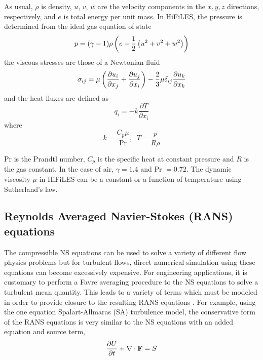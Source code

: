 As usual, $\rho$ is density, $u$, $v$, $w$ are the velocity components in the $x, y, z$ directions, respectively, and $e$ is total energy per unit mass. In HiFiLES, the pressure is determined from the ideal gas equation of state
\begin{equation}
p = (\gamma - 1)\rho\left(e - \frac{1}{2}\left(u^2 + v^2 + w^2\right)\right)
\end{equation}
the viscous stresses are those of a Newtonian fluid
\begin{equation}
\sigma_{ij} = \mu\left( \frac{\partial u_i}{\partial x_j}
+ \frac{\partial u_j}{\partial x_i} \right)
- \frac{2}{3}\mu \delta_{ij}\frac{\partial u_k}{\partial x_k}
\end{equation}
and the heat fluxes are defined as
\begin{equation}
q_i = -k \frac{\partial T}{\partial x_i}
\end{equation}
where
\begin{equation}
k = \frac{C_p \mu}{\text{Pr}} , \;\; T = \frac{p}{R \rho}
\end{equation}

Pr is the Prandtl number, $C_p$ is the specific heat at constant pressure and $R$ is the gas constant. In the case of air, $\gamma = 1.4$ and Pr $= 0.72$. The dynamic viscosity $\mu$ in HiFiLES can be a constant or a function of temperature using Sutherland's law.


\subsection{Reynolds Averaged Navier-Stokes (RANS) equations}
The compressible NS equations can be used to solve a variety of different flow physics problems but for turbulent flows, direct numerical simulation using these equations can become excessively expensive. For engineering applications, it is customary to perform a Favre averaging procedure to the NS equations to solve a turbulent mean quantity. This leads to a variety of terms which must be modeled in order to provide closure to the resulting RANS equations \cite{wilcox1998turbulence,oliver2008high}. For example, using the one equation Spalart-Allmaras (SA) turbulence model, the conservative form of the RANS equations is very similar to the NS equations with an added equation and source term,
\begin{align}
	\frac{\partial U}{\partial t} +  \nabla \cdot {\bf F} = S
\end{align}

